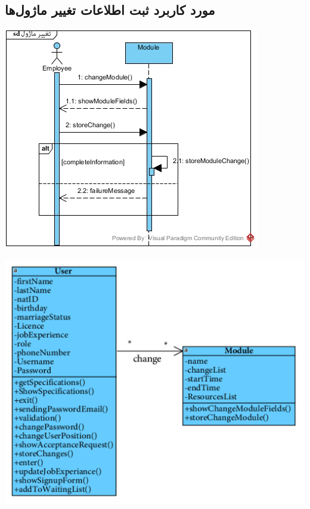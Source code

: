 \newpage
\vspace{2cm}
\subsection*{مورد کاربرد ثبت اطلاعات تغییر ماژول‌ها}
\vspace{2cm}
\begin{center}
\includegraphics[width=\textwidth]{SequenceDiagrams/28.jpg}
\end{center}

\newpage
\vspace{2cm}
\begin{center}
\includegraphics[width=\textwidth]{SequenceClasses/28.png}
\end{center}

